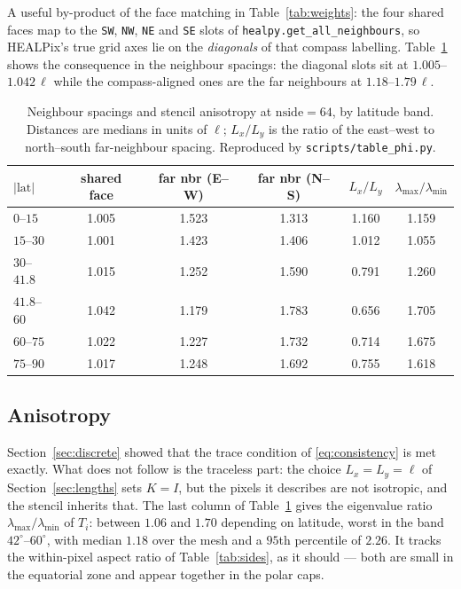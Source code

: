 \documentclass[11pt]{article}
\newcommand{\grid}{\ell}
\begin{document}
A useful by-product of the face matching in Table~\ref{tab:weights}: the four shared
faces map to the \texttt{SW}, \texttt{NW}, \texttt{NE} and \texttt{SE} slots of
\texttt{healpy.get\_all\_neighbours}, so HEALPix's true grid axes lie on the
\emph{diagonals} of that compass labelling. Table~\ref{tab:phi} shows the consequence in
the neighbour spacings: the diagonal slots sit at $1.005$--$1.042\,\grid$ while the
compass-aligned ones are the far neighbours at $1.18$--$1.79\,\grid$.

\begin{table}[htbp]
\centering
\caption{Neighbour spacings and stencil anisotropy at $\mathrm{nside}=64$, by latitude
band. Distances are medians in units of $\grid$; $L_x/L_y$ is the ratio of the
east--west to north--south far-neighbour spacing. Reproduced by
\texttt{scripts/table\_phi.py}.}
\label{tab:phi}
\begin{tabular}{lccccc}
\toprule
$|\mathrm{lat}|$ & shared face & far nbr (E--W) & far nbr (N--S) & $L_x/L_y$ & $\lambda_{\max}/\lambda_{\min}$ \\
\midrule
$0$--$15$    & 1.005 & 1.523 & 1.313 & 1.160 & 1.159 \\
$15$--$30$   & 1.001 & 1.423 & 1.406 & 1.012 & 1.055 \\
$30$--$41.8$ & 1.015 & 1.252 & 1.590 & 0.791 & 1.260 \\
$41.8$--$60$ & 1.042 & 1.179 & 1.783 & 0.656 & 1.705 \\
$60$--$75$   & 1.022 & 1.227 & 1.732 & 0.714 & 1.675 \\
$75$--$90$   & 1.017 & 1.248 & 1.692 & 0.755 & 1.618 \\
\bottomrule
\end{tabular}
\end{table}

\subsection{Anisotropy}
\label{sec:aniso}

Section~\ref{sec:discrete} showed that the trace condition of
\eqref{eq:consistency} is met exactly. What does not follow is the traceless part: the
choice $L_x = L_y = \grid$ of Section~\ref{sec:lengths} sets $K = I$, but the pixels it
describes are not isotropic, and the stencil inherits that. The last column of
Table~\ref{tab:phi} gives the eigenvalue ratio $\lambda_{\max}/\lambda_{\min}$ of $T_i$:
between $1.06$ and $1.70$ depending on latitude, worst in the band $42^\circ$--$60^\circ$,
with median $1.18$ over the mesh and a $95$th percentile of $2.26$. It tracks the
within-pixel aspect ratio of Table~\ref{tab:sides}, as it should --- both are small in
the equatorial zone and appear together in the polar caps.
\end{document}
